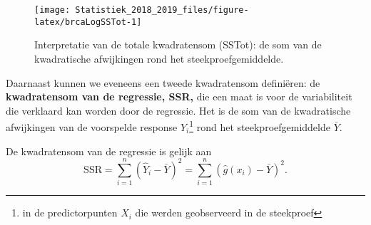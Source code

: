 \documentclass[12pt,dutch,coursenotes]{book}
\newenvironment{Shaded}{\begin{snugshade}}{\end{snugshade}}
\newcommand{\KeywordTok}[1]{\textcolor[rgb]{0.13,0.29,0.53}{\textbf{#1}}}
\newcommand{\DataTypeTok}[1]{\textcolor[rgb]{0.13,0.29,0.53}{#1}}
\newcommand{\DecValTok}[1]{\textcolor[rgb]{0.00,0.00,0.81}{#1}}
\newcommand{\FloatTok}[1]{\textcolor[rgb]{0.00,0.00,0.81}{#1}}
\newcommand{\StringTok}[1]{\textcolor[rgb]{0.31,0.60,0.02}{#1}}
\newcommand{\ControlFlowTok}[1]{\textcolor[rgb]{0.13,0.29,0.53}{\textbf{#1}}}
\newcommand{\OperatorTok}[1]{\textcolor[rgb]{0.81,0.36,0.00}{\textbf{#1}}}
\newcommand{\NormalTok}[1]{#1}
\let\rmarkdownfootnote\footnote%
\def\footnote{\protect\rmarkdownfootnote}
\theoremstyle{definition}
\theoremstyle{definition}
\theoremstyle{definition}
\theoremstyle{remark}
\begin{document}
\begin{Shaded}
\end{Shaded}

\begin{figure}

{\centering \texttt{[image: Statistiek\_2018\_2019\_files/figure-latex/brcaLogSSTot-1]} 

}

\caption{Interpretatie van de totale kwadratensom (SSTot): de som van de kwadratische afwijkingen rond het steekproefgemiddelde.}\label{fig:brcaLogSSTot}
\end{figure}

Daarnaast kunnen we eveneens een tweede kwadratensom definiëren: de
\textbf{kwadratensom van de regressie, SSR,} die een maat is voor de
variabiliteit die verklaard kan worden door de regressie. Het is de som
van de kwadratische afwijkingen van de voorspelde response
\(\hat{Y}_i\)\footnote{in de predictorpunten \(X_i\) die werden
  geobserveerd in de steekproef} rond het steekproefgemiddelde
\(\bar Y\).

De kwadratensom van de regressie is gelijk aan
\[\text{SSR} = \sum_{i=1}^n (\hat{Y}_i - \bar{Y})^2 = \sum_{i=1}^n (\hat{g}(x_i) - \bar{Y})^2.\]
\end{document}
